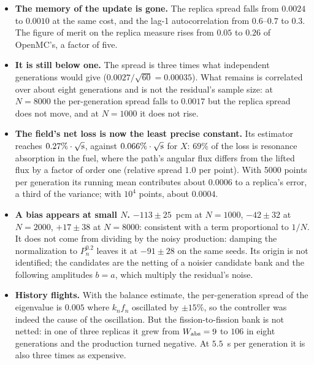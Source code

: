 \begin{itemize}
\item \textbf{The memory of the update is gone.} The replica spread falls from $0.0024$ to $0.0010$
  at the same cost, and the lag-1 autocorrelation from $0.6$--$0.7$ to $0.3$. The figure of merit
  on the replica measure rises from $0.05$ to $0.26$ of OpenMC's, a factor of five.
\item \textbf{It is still below one.} The spread is three times what independent generations would
  give ($0.0027/\sqrt{60}=0.00035$). What remains is correlated over about eight generations and is
  not the residual's sample size: at $N=8000$ the per-generation spread falls to $0.0017$ but the
  replica spread does not move, and at $N=1000$ it does not rise.
\item \textbf{The field's net loss is now the least precise constant.} Its estimator reaches
  $0.27\%\cdot\sqrt{\text s}$, against $0.066\%\cdot\sqrt{\text s}$ for $X$: $69\%$ of the loss is
  resonance absorption in the fuel, where the path's angular flux differs from the lifted flux by a
  factor of order one (relative spread $1.0$ per point). With 5000 points per generation its
  running mean contributes about $0.0006$ to a replica's error, a third of the variance; with
  $10^4$ points, about $0.0004$.
\item \textbf{A bias appears at small $N$.} $-113\pm25$~pcm at $N=1000$, $-42\pm32$ at $N=2000$,
  $+17\pm38$ at $N=8000$: consistent with a term proportional to $1/N$. It does not come from
  dividing by the noisy production: damping the normalization to $P_n^{0.2}$ leaves it at
  $-91\pm28$ on the same seeds. Its origin is not identified; the candidates are the netting of a
  noisier candidate bank and the following amplitudes $b=a$, which multiply the residual's noise.
\item \textbf{History flights.} With the balance estimate, the per-generation spread of the
  eigenvalue is $0.005$ where $k_nf_n$ oscillated by $\pm15\%$, so the controller was indeed the
  cause of the oscillation. But the fission-to-fission bank is not netted: in one of three replicas
  it grew from $W_{\mathrm{abs}}=9$ to $106$ in eight generations and the production turned negative. At
  $5.5$~s per generation it is also three times as expensive.
\end{itemize}


